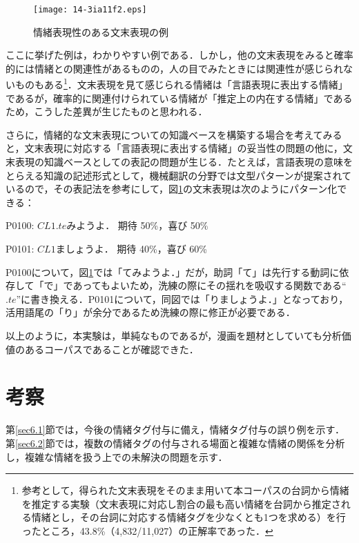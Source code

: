 \documentclass[japanese]{jnlp_1.3c}
\begin{document}
\begin{figure}[t]
\begin{center}
    \texttt{[image: 14-3ia11f2.eps]}
\caption{情緒表現性のある文末表現の例} \label{fig2}
\end{center}
\end{figure}

ここに挙げた例は，わかりやすい例である．しかし，他の文末表現をみると確率的には情緒との関連性があるものの，人の目でみたときには関連性が感じられないものもある\footnote{参考として，得られた文末表現をそのまま用いて本コーパスの台詞から情緒を推定する実験（文末表現に対応し割合の最も高い情緒を台詞から推定される情緒とし，その台詞に対応する情緒タグを少なくとも1つを求める）を行ったところ，43.8\%（4,832/11,027）の正解率であった．}．文末表現を見て感じられる情緒は「言語表現に表出する情緒」であるが，確率的に関連付けられている情緒が「推定上の内在する情緒」であるため，こうした差異が生じたものと思われる．

さらに，情緒的な文末表現についての知識ベースを構築する場合を考えてみると，文末表現に対応する「言語表現に表出する情緒」の妥当性の問題の他に，文末表現の知識ベースとしての表記の問題が生じる．たとえば，言語表現の意味をとらえる知識の記述形式として，機械翻訳の分野では文型パターンが提案されている\cite{池原04}ので，その表記法を参考にして，図\ref{fig2}の文末表現は次のようにパターン化できる：
\begin{description}
\item P0100: $CL1.te$みようよ． 期待 50\%，喜び 50\%
\item P0101: $CL1$ましょうよ．  期待 40\%，喜び 60\%
\end{description}
P0100について，図\ref{fig2}では「てみようよ．」だが，助詞「て」は先行する動詞に依存して「で」であってもよいため，洗練の際にその揺れを吸収する関数である``$.te$''に書き換える．P0101について，同図では「りましょうよ．」となっており，活用語尾の「り」が余分であるため洗練の際に修正が必要である．

以上のように，本実験は，単純なものであるが，漫画を題材としていても分析価値のあるコーパスであることが確認できた．


\section{考察}

第\ref{sec6.1}節では，今後の情緒タグ付与に備え，情緒タグ付与の誤り例を示す．第\ref{sec6.2}節では，複数の情緒タグの付与される場面と複雑な情緒の関係を分析し，複雑な情緒を扱う上での未解決の問題を示す．
\end{document}
